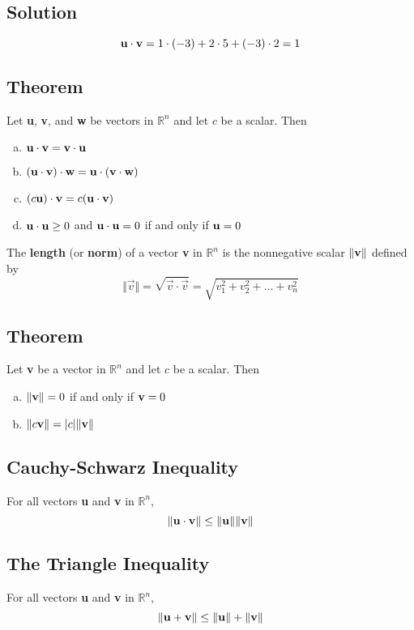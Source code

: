 \subsection*{Solution}
$$\mathbf{u \cdot v} = 1 \cdot (-3) + 2 \cdot 5 + (-3) \cdot 2 = 1$$

\subsection*{Theorem}
Let \textbf{u}, \textbf{v}, and \textbf{w} be vectors in $\mathbb{R}^n$ and let $c$
be a scalar. Then
\begin{enumerate}[(a)]
    \item $\mathbf{u\cdot v=v\cdot u}$
    \item $\mathbf{(u\cdot v)\cdot w=u\cdot(v\cdot w)}$
    \item $(c\mathbf{u})\cdot\mathbf{v}=c(\mathbf{u\cdot v})$
    \item $\mathbf{u\cdot u}\geq 0$ and $\mathbf{u\cdot u}=0$ if and only if $\mathbf{u}=0$
\end{enumerate}

The \textbf{length} (or \textbf{norm}) of a vector \textbf{v} in $\mathbb{R}^n$ is the
nonnegative scalar $\Vert\mathbf{v}\Vert$ defined by
$$\Vert\vec{v}\Vert=\sqrt{\vec{v}\cdot\vec{v}}=\sqrt{v_1^2+v_2^2+\dots+v_n^2}$$

\subsection*{Theorem}
Let \textbf{v} be a vector in $\mathbb{R}^n$ and let $c$ be a scalar. Then
\begin{enumerate}[(a)]
    \item $\Vert\mathbf{v}\Vert=0$ if and only if $\mathbf{v}=0$
    \item $\Vert c\mathbf{v}\Vert=|c|\Vert\mathbf{v}\Vert$
\end{enumerate}

\subsection*{Cauchy-Schwarz Inequality}
For all vectors \textbf{u} and \textbf{v} in $\mathbb{R}^n$,
$$\Vert\mathbf{u\cdot v}\Vert\leq\Vert\mathbf{u}\Vert \Vert\mathbf{v}\Vert$$

\subsection*{The Triangle Inequality}
For all vectors \textbf{u} and \textbf{v} in $\mathbb{R}^n$,
$$\Vert\mathbf{u+v}\Vert\leq\Vert\mathbf{u}\Vert+\Vert\mathbf{v}\Vert$$

